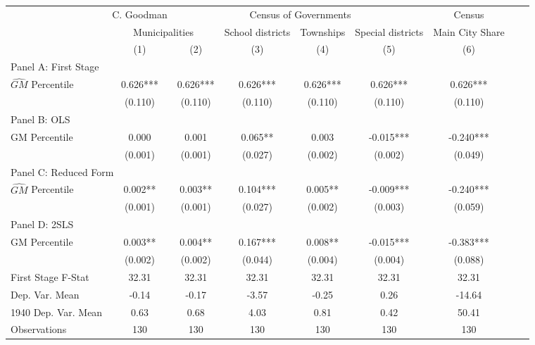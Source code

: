  \begin{tabular}{l*{8}{c}} \toprule
&\multicolumn{1}{c}{C. Goodman}&\multicolumn{4}{c}{Census of Governments}&\multicolumn{1}{c}{Census}\\\cmidrule(lr){2-2}\cmidrule(lr){3-6}\cmidrule(lr){7-7}
&\multicolumn{2}{c}{Municipalities}&\multicolumn{1}{c}{School districts}&\multicolumn{1}{c}{Townships}&\multicolumn{1}{c}{Special districts}&\multicolumn{1}{c}{Main City Share}\\\cmidrule(lr){2-3}\cmidrule(lr){4-6}\cmidrule(lr){7-7}
&\multicolumn{1}{c}{(1)}&\multicolumn{1}{c}{(2)}&\multicolumn{1}{c}{(3)}&\multicolumn{1}{c}{(4)}&\multicolumn{1}{c}{(5)}&\multicolumn{1}{c}{(6)}\\
\cmidrule(lr){1-7}
\multicolumn{6}{l}{Panel A: First Stage}\\
\cmidrule(lr){1-7}
$\widehat{GM}$ Percentile&    0.626***&    0.626***&    0.626***&    0.626***&    0.626***&    0.626***\\
                &  (0.110)   &  (0.110)   &  (0.110)   &  (0.110)   &  (0.110)   &  (0.110)   \\
\cmidrule(lr){1-7}
\multicolumn{6}{l}{Panel B: OLS}\\
\cmidrule(lr){1-7}
GM Percentile   &    0.000   &    0.001   &    0.065** &    0.003   &   -0.015***&   -0.240***\\
                &  (0.001)   &  (0.001)   &  (0.027)   &  (0.002)   &  (0.002)   &  (0.049)   \\
\cmidrule(lr){1-7}
\multicolumn{6}{l}{Panel C: Reduced Form}\\
\cmidrule(lr){1-7}
$\widehat{GM}$ Percentile&    0.002** &    0.003** &    0.104***&    0.005** &   -0.009***&   -0.240***\\
                &  (0.001)   &  (0.001)   &  (0.027)   &  (0.002)   &  (0.003)   &  (0.059)   \\
\cmidrule(lr){1-7}
\multicolumn{6}{l}{Panel D: 2SLS}\\
\cmidrule(lr){1-7}
GM Percentile   &    0.003** &    0.004** &    0.167***&    0.008** &   -0.015***&   -0.383***\\
                &  (0.002)   &  (0.002)   &  (0.044)   &  (0.004)   &  (0.004)   &  (0.088)   \\
\midrule
First Stage F-Stat&    32.31   &    32.31   &    32.31   &    32.31   &    32.31   &    32.31   \\
Dep. Var. Mean  &    -0.14   &    -0.17   &    -3.57   &    -0.25   &     0.26   &   -14.64   \\
1940 Dep. Var. Mean&     0.63   &     0.68   &     4.03   &     0.81   &     0.42   &    50.41   \\
Observations    &      130   &      130   &      130   &      130   &      130   &      130   \\
       \bottomrule \end{tabular}
